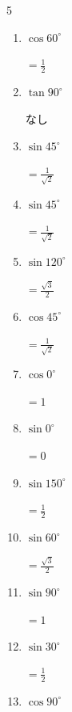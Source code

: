 \begin{multicols}{5}
\begin{enumerate}
        $\displaystyle =1$

  \item $\displaystyle \cos{60^\circ}$

        $\displaystyle =\frac{1}{2}$

  \item $\displaystyle \tan{90^\circ}$

        $\displaystyle なし$

  \item $\displaystyle \sin{45^\circ}$

        $\displaystyle =\frac{1}{\sqrt{2}}$

  \item $\displaystyle \sin{45^\circ}$

        $\displaystyle =\frac{1}{\sqrt{2}}$

  \item $\displaystyle \sin{120^\circ}$

        $\displaystyle =\frac{\sqrt{3}}{2}$

  \item $\displaystyle \cos{45^\circ}$

        $\displaystyle =\frac{1}{\sqrt{2}}$

  \item $\displaystyle \cos{0^\circ}$

        $\displaystyle =1$

\columnbreak %

  \item $\displaystyle \sin{0^\circ}$

        $\displaystyle =0$

  \item $\displaystyle \sin{150^\circ}$

        $\displaystyle =\frac{1}{2}$

  \item $\displaystyle \sin{60^\circ}$

        $\displaystyle =\frac{\sqrt{3}}{2}$

  \item $\displaystyle \sin{90^\circ}$

        $\displaystyle =1$

  \item $\displaystyle \sin{30^\circ}$

        $\displaystyle =\frac{1}{2}$

  \item $\displaystyle \cos{90^\circ}$


\end{enumerate}
\end{multicols}
